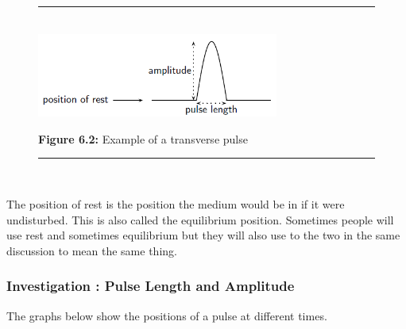 	\begin{figure}[H] %
    \begin{center}
    \rule[.1in]{\figurerulewidth}{.005in} \\
        \label{m38801*uid2!!!underscore!!!media}\label{m38801*uid2!!!underscore!!!printimage}\includegraphics[width=300px]{col11305.imgs/m38801_PG10C4_002.png} %
        
      \vspace{2pt}
    \vspace{\rubberspace}\par \begin{cnxcaption}
	  \small \textbf{Figure 6.2: }Example of a transverse pulse
	\end{cnxcaption}
      
    \vspace{.1in}
    \rule[.1in]{\figurerulewidth}{.005in} \\
        
    \end{center}

 \end{figure}   

    \addtocounter{footnote}{-0}
    
\label{m38801*eip-400}The position of rest is the position the medium would be in if it were undisturbed. This is also called the equilibrium position. Sometimes people will use rest and sometimes equilibrium but they will also use to the two in the same discussion to mean the same thing.\par \label{m38801*secfhsst!!!underscore!!!id87}
            \subsubsection{  Investigation : Pulse Length and Amplitude }
            \nopagebreak
            
        \label{m38801*id312993}The graphs below show the positions of a pulse at different times.\par 
        \label{m38801*id312998}
          
    \setcounter{subfigure}{0}


